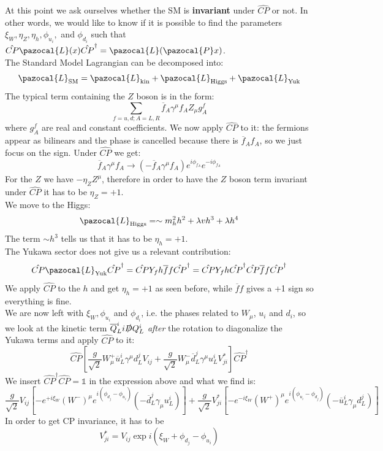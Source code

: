 \documentclass[../main.tex]{subfiles}
\begin{document}
At this point we ask ourselves whether the SM is \textbf{invariant} under $\hat{CP}$ or not. In other words, we would like to know if it is possible to find the parameters $\xi_W, \eta_Z, \eta_h, \phi_{u_i},$ and $\phi_{d_i}$ such that $\hat{CP}\pazocal{L}(x)\hat{CP}^\dagger=\pazocal{L}(\pazocal{P}x)$.\\
The Standard Model Lagrangian can be decomposed into: 
\[
\pazocal{L}_{\text{SM}}=\pazocal{L}_{\text{kin}}+\pazocal{L}_{\text{Higgs}}+\pazocal{L}_{\text{Yuk}}
\]
The typical term containing the $Z$ boson is in the form:
\[
\sum_{f=u,d;A=L,R}\overline{f}_A\gamma^\mu f_AZ_\mu g_A^f
\]
where $g_A^f$ are real and constant coefficients. We now apply $\hat{CP}$ to it: the fermions appear as bilinears and the phase is cancelled because there is $\overline{f}_Af_A$, so we just focus on the sign. Under $\hat{CP}$ we get:
\[
\overline{f}_A\gamma^\mu f_A\xrightarrow[]{}(-\overline{f}_A\gamma^\mu f_A)e^{i\phi_{f_A}}e^{-i\phi_{f_A}}
\]
For the $Z$ we have $-\eta_ZZ^\mu$, therefore in order to have the $Z$ boson term invariant under $\hat{CP}$ it has to be $\eta_Z=+1$.\\
We move to the Higgs: 
\[
\pazocal{L}_{\text{Higgs}}=\sim m_h^2h^2+\lambda vh^3+\lambda h^4
\]
The term $\sim h^3$ tells us that it has to be $\eta_h=+1$.\\
The Yukawa sector does not give us a relevant contribution:
\[
\hat{CP}\pazocal{L}_{\text{Yuk}}\hat{CP}^\dagger=\hat{CP}Y_fh\overline{f}f\hat{CP}^\dagger=\hat{CP}Y_fh\hat{CP}^\dagger\hat{CP}\overline{f}f\hat{CP}^\dagger
\]
We apply $\hat{CP}$ to the $h$ and get $\eta_h=+1$ as seen before, while $\overline{f}f$ gives a +1 sign so everything is fine.\\
We are now left with $\xi_W, \phi_{u_i}$ and $\phi_{d_i}$, i.e. the phases related to $W_\mu$, $u_i$ and $d_i$, so we look at the kinetic term $\overline{Q}_L^ii\slashed{D}Q_L^i$ \textit{after} the rotation to diagonalize the Yukawa terms and apply $\hat{CP}$ to it:
\[
\hat{CP}\left[\frac{g}{\sqrt{2}}W_\mu^+\overline{u}_L^i\gamma^\mu d^j_LV_{ij}+\frac{g}{\sqrt{2}}W_\mu^-\overline{d}_L^j\gamma^\mu u_L^iV_{ji}^*\right]\hat{CP}^\dagger
\]
We insert $\hat{CP}^\dagger\hat{CP}=\mathbb{1}$ in the expression above and what we find is:
\[
\frac{g}{\sqrt{2}}V_{ij}\left[-e^{+i\xi_W}(W^-)^\mu e^{i(\phi_{d_j}-\phi_{u_i})}\left(-\overline{d}_L^j\gamma_\mu u_L^i\right)\right]+\frac{g}{\sqrt{2}}V_{ji}^*\left[-e^{-i\xi_W}(W^+)^\mu e^{i(\phi_{u_i}-\phi_{d_j})}\left(-\overline{u}_L^i\gamma_\mu d_L^j\right)\right]
\]
In order to get CP invariance, it has to be 
\[
V_{ji}^*=V_{ij}\exp{i(\xi_W+\phi_{d_j}-\phi_{u_i})}
\]
\end{document}
